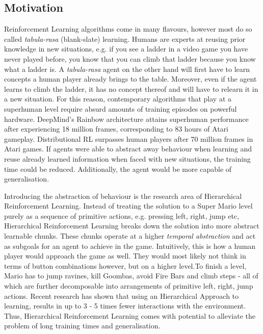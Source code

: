 \documentclass[notitlepage,a4paper,11pt]{article}
\begin{document}
\subsection{Motivation}
Reinforcement Learning algorithms come in many flavours, however most do so called \textit{tabula-rasa} (blank-slate) learning. Humans are experts at reusing prior knowledge in new situations, e.g. if you see a ladder in a video game you have never played before, you know that you can climb that ladder because you know what a ladder is. A \textit{tabula-rasa} agent on the other hand will first have to learn concepts a human player already brings to the table. Moreover, even if the agent learns to climb the ladder, it has no concept thereof and will have to relearn it in a new situation. For this reason, contemporary algorithms that play at a superhuman level require absurd amounts of training episodes on powerful hardware. DeepMind's Rainbow architecture \cite{hessel2018rainbow} attains superhuman performance after experiencing 18 million frames, corresponding to 83
hours of Atari gameplay. Distributional RL \cite{bellemare2017distributional} surpasses human
players after 70 million frames in Atari games. If agents were able to abstract away behaviour when learning and reuse already learned information when faced with new situations, the training time could be reduced. Additionally, the agent would be more capable of generalisation.

Introducing the abstraction of behaviour is the research area of Hierarchical Reinforcement Learning. Instead of treating the solution to a Super Mario level purely as a sequence of primitive actions, e.g. pressing left, right, jump etc, Hierarchical Reinforcement Learning breaks down the solution into more abstract learnable chunks. These chunks operate at a higher \textit{temporal abstraction} and act as subgoals for an agent to achieve in the game. Intuitively, this is how a human player would approach the game as well. They would most likely not think in terms of button combinations however, but on a higher level.To finish a level, Mario has to jump ravines, kill Goombas, avoid Fire Bars and climb steps - all of which are further decomposable into arrangements of primitive left, right, jump actions. Recent research \cite{nachum2019does} has shown that using an Hierarchical Approach to learning, results in up to 3 - 5 times fewer interactions with the environment. Thus, Hierarchical Reinforcement Learning comes with potential to alleviate the problem of long training times and generalisation. 
\end{document}
